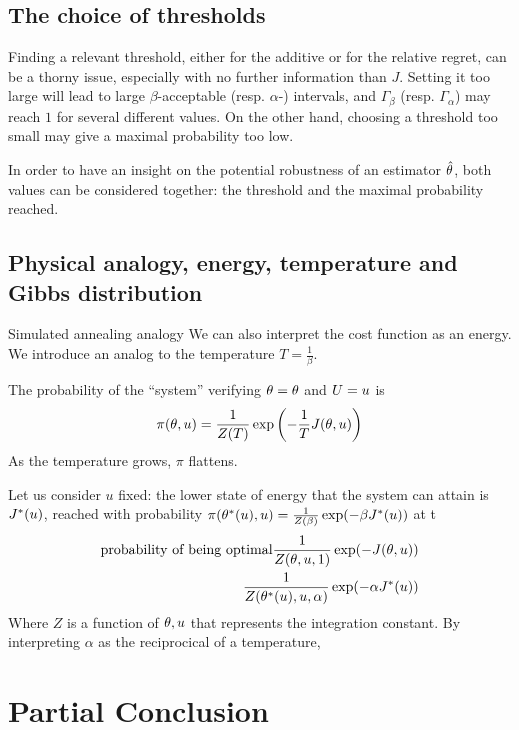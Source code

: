 \documentclass[../../Main_ManuscritThese.tex]{subfiles}
\begin{document}
\subsection{The choice of thresholds}
\label{sec:choice_threshold}
  
Finding a relevant threshold, either for the additive or for the relative regret,  can be a thorny issue, especially with no further information than $J$. Setting it too large will lead to large $\beta$-acceptable (resp. $\alpha$-) intervals, and $\Gamma_\beta$ (resp. $\Gamma_\alpha$) may reach $1$ for several different values. On the other hand, choosing a threshold too small may give a maximal probability too low.


In order to have an insight on the potential robustness of an estimator $\hat{\theta}_{\mathrm{}}$, both values can be considered together: the threshold and the maximal probability reached.




\subsection{Physical analogy, energy, temperature and Gibbs distribution}
Simulated annealing analogy
We can also interpret the cost function as an energy. We introduce an analog to the temperature $T = \frac{1}{\beta}$.

The probability of the ``system'' verifying $\theta=\theta$ and $U=u$ is
\begin{equation}
\pi(\theta, u)=\frac{1}{Z(T)}\exp\left(-\frac{1}{T}J(\theta,u)\right)
\end{equation}
As the temperature grows, $\pi$ flattens.

Let us consider $u$ fixed:
the lower state of energy that the system can attain is $J^*(u)$, reached with probability
$\pi(\theta^*(u), u) = \frac{1}{Z(\beta)}\exp(-\beta J^*(u))$ at t
\begin{align}
  \text{probability of being optimal}\frac{1}{Z(\theta, u, 1)}\exp(-J(\theta,u)) \\
  \frac{1}{Z(\theta^*(u), u, \alpha)}\exp(-\alpha J^*(u))
\end{align}
Where $Z$ is a function of $\theta,u$ that represents the integration constant.
By interpreting $\alpha$ as the reciprocical of a temperature, 


\section{Partial Conclusion}
\label{sec:ch3_partial_ccl}



\subfileLocal{
	\pagestyle{empty}
	
	
      }
\end{document}
